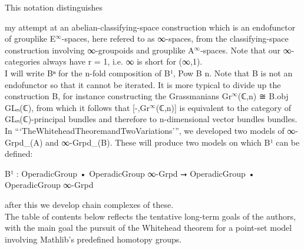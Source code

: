 \documentclass{book}
\theoremstyle{definition}
\begin{document}
This notation distinguishes 

my attempt at an abelian-classifying-space construction which is an endofunctor of grouplike E${}^{\infty}$-spaces, here refered to as ∞-spaces, from the classifying-space construction involving ∞-groupoids and grouplike A${}^{\infty}$-spaces. Note that our ∞-categories always have r = 1, i.e. ∞ is short for (∞,1).\\

I will write Bⁿ for the n-fold composition of B¹, Pow B n. Note that B is not an endofunctor so that it cannot be iterated. It is more typical to divide up the construction B, for instance constructing the Grassmanians Gr${}^{\infty}$(ℂ,n) ≅ B.obj GLₙ(ℂ), from which it follows that [-,Gr${}^{\infty}$(ℂ,n)] is equivalent to the category of GLₙ(ℂ)-principal bundles and therefore to n-dimensional vector bundles bundles.\\

In ```TheWhiteheadTheoremandTwoVariations''', we developed two models of ∞-Grpd\_(A) and ∞-Grpd\_(B). These will produce two models on which B¹ can be defined:

\begin{center}
B¹ : OperadicGroup • OperadicGroup ∞-Grpd ⭢ OperadicGroup • OperadicGroup ∞-Grpd
\end{center}

after this we develop chain complexes of these.\\

The table of contents below reflects the tentative long-term goals of the authors, with the main goal the pursuit of the Whitehead theorem for a point-set model involving Mathlib's predefined homotopy groups.\\
\end{document}
